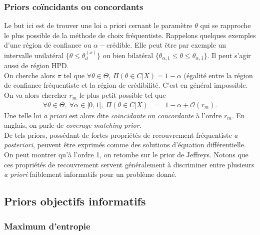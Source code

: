 
\subsubsection{Priors co\"incidants ou concordants}

Le but ici est de trouver une loi a priori cernant le paramètre $\theta$ qui se rapproche le plus possible de la méthode de choix fréquentiste. Rappelons quelques exemples d’une région de confiance ou $\alpha-$crédible. Elle peut être par exemple un intervalle unilatéral $\{\theta\leq \theta^{(x)}_d\}$ ou bien bilatéral $\{\theta_{\alpha,1}\leq \theta \leq \theta_{\alpha,1}\}$. Il peut s’agir aussi de région HPD. \\

On cherche alors $\pi$ tel que $\forall \theta\in\Theta$, $\Pi(\theta\in C|X)=1-\alpha$ (égalité entre la région de confiance fréquentiste et la région de crédibilité. C’est en général impossible. On va alors chercher $r_m$ le plus petit possible tel que 
\begin{eqnarray*}
\forall \theta\in\Theta, \ \forall \alpha\in]0,1[, \ \Pi(\theta\in C|X) & = & 1-\alpha + \mathcal{O}(r_m).
\end{eqnarray*}
 Une telle loi {\it a priori} est alors dite \emph{coincidante} ou \emph{concordante} à l'ordre $r_m$. En anglais, on parle de \emph{coverage matching prior}. \\
 
 De tels priors, possédant de fortes propriétés de recouvrement fréquentiste {\it a posteriori}, peuvent être exprimés comme des solutions d'équation différentielle. On peut montrer qu'à l'ordre 1, on retombe sur le prior de Jeffreys. Notons que ces propriétés de recouvrement servent généralement à discriminer entre plusieurs {\it a priori} faiblement informatifs pour un problème donné. 


\subsection{Priors objectifs informatifs}


\subsubsection{Maximum d'entropie}\label{maximum.entropie}

